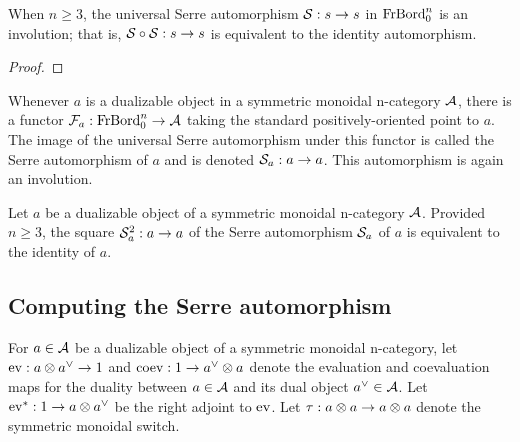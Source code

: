 \documentclass{amsart}
\begin{document}

\begin{proposition}
When $n \geq 3$, the universal Serre automorphism $\mathcal S: s \rightarrow s$ in $\mathrm{FrBord}_0^n$ is an involution; that is, $\mathcal S \circ \mathcal S : s \rightarrow s$ is equivalent to the identity automorphism.
\end{proposition}

\begin{proof}
\end{proof}

Whenever $a$ is a dualizable object in a symmetric monoidal n-category $\mathcal A$, there is a functor $\mathcal F_a: \mathrm{FrBord}_0^n \rightarrow \mathcal A$ taking the standard positively-oriented point to $a$.  The image of the universal Serre automorphism under this functor is called the Serre automorphism of $a$ and is denoted $\mathcal S_a : a \rightarrow a$.  This automorphism is again an involution.

\begin{corollary} \label{cor-serreinvol}
Let $a$ be a dualizable object of a symmetric monoidal n-category $\mathcal A$.  Provided $n \geq 3$, the square $\mathcal S_a^2 : a \rightarrow a$ of the Serre automorphism $\mathcal S_a$ of $a$ is equivalent to the identity of $a$.
\end{corollary}


\subsection{Computing the Serre automorphism}

For $a \in \mathcal A$ be a dualizable object of a symmetric monoidal n-category, let $\mathrm{ev} : a \otimes a^{\vee} \rightarrow 1$ and $\mathrm{coev}: 1 \rightarrow a^{\vee} \otimes a$ denote the evaluation and coevaluation maps for the duality between $a \in \mathcal A$ and its dual object $a^{\vee} \in \mathcal A$.  Let $\mathrm{ev}^*: 1 \rightarrow a \otimes a^{\vee}$ be the right adjoint to $\mathrm{ev}$.  Let $\tau: a \otimes a \rightarrow a \otimes a$ denote the symmetric monoidal switch.
\end{document}
